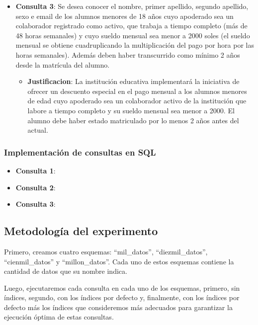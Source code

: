 \begin{itemize}
\begin{itemize}
	      \end{itemize}
	\item{\textbf{Consulta 3}: Se desea conocer el nombre, primer apellido, segundo apellido, sexo e email de los alumnos menores de 18 años cuyo apoderado sea un colaborador registrado como activo, que trabaja a tiempo completo (más de 48 horas semanales) y cuyo sueldo mensual sea menor a 2000 soles (el sueldo mensual se obtiene cuadruplicando la multiplicación del pago por hora por las horas semanales). Además deben haber transcurrido como mínimo 2 años desde la matrícula del alumno.}
	      \begin{itemize}
		      \item{\textbf{Justificacion}: La institución educativa implementará la iniciativa de ofrecer un descuento especial en el pago mensual a los alumnos menores de edad cuyo apoderado sea un colaborador activo de la institución que labore a tiempo completo y su sueldo mensual sea menor a 2000. El alumno debe haber estado matriculado por lo menos 2 años antes del actual.}
	      \end{itemize}
\end{itemize}
\subsubsection{Implementación de consultas en SQL}
\begin{itemize}
	\item{\textbf{Consulta 1}:
	      }
	\item{\textbf{Consulta 2}:
	      }
	\item{\textbf{Consulta 3}:
	      }
\end{itemize}
\subsection{Metodología del experimento}
\begin{sloppypar}
	Primero, creamos cuatro esquemas: ``mil\_datos'', ``diezmil\_datos'', ``cienmil\_datos'' y ``millon\_datos''. Cada uno de estos esquemas contiene la cantidad de datos que su nombre indica.
\end{sloppypar}


Luego, ejecutaremos cada consulta en cada uno de los esquemas, primero, sin índices, segundo, con los índices por defecto y, finalmente, con los índices por defecto más los índices que consideremos más adecuados para garantizar la ejecución óptima de estas consultas.\\

